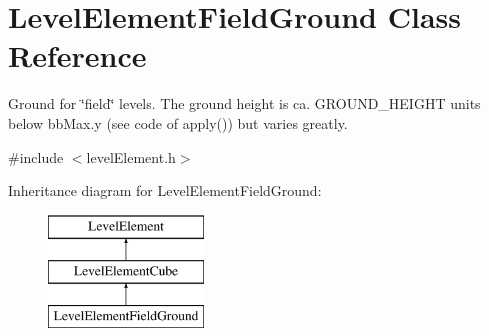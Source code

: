 \hypertarget{classLevelElementFieldGround}{
\section{\-Level\-Element\-Field\-Ground \-Class \-Reference}
\label{dc/dcc/classLevelElementFieldGround}
}


\-Ground for \char`\"{}field\char`\"{} levels. \-The ground height is ca. \-G\-R\-O\-U\-N\-D\-\_\-\-H\-E\-I\-G\-H\-T units below bb\-Max.\-y (see code of apply()) but varies greatly.  




{\ttfamily \#include $<$level\-Element.\-h$>$}

\-Inheritance diagram for \-Level\-Element\-Field\-Ground\-:\begin{figure}[H]
\begin{center}
\leavevmode
\includegraphics[height=3.000000cm]{dc/dcc/classLevelElementFieldGround}
\end{center}
\end{figure}
